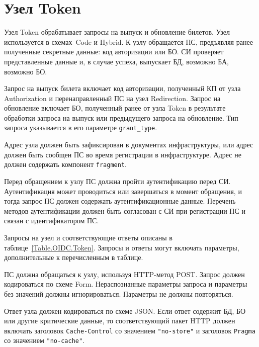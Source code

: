 \section{Узел Token}\label{OIDC.Token}

Узел Token обрабатывает запросы на выпуск и обновление билетов.
%
Узел используется в схемах~Code и Hybrid. 
% 
К узлу обращается ПС, предъявляя ранее полученные секретные данные:
код авторизации или БО.
%
СИ проверяет представленные данные и, в случае успеха, выпускает БД, 
возможно БА, возможно БО.

Запрос на выпуск билета включает код авторизации, полученный КП от узла 
Authorization и перенаправленный ПС на узел Redirection. 
%
Запрос на обновление включает БО, полученный ранее от узла Token в результате 
обработки запроса на выпуск или предыдущего запроса на обновление.
%
Тип запроса указывается в его параметре \lstinline{grant_type}.

Адрес узла должен быть зафиксирован в документах инфраструктуры,
или адрес должен быть сообщен ПС во время регистрации в инфраструктуре.
%
Адрес не должен содержать компонент \lstinline{fragment}.

Перед обращением к узлу ПС должна пройти аутентификацию перед СИ. 
Аутентификация может проводиться или завершаться в момент обращения,
и тогда запрос ПС должен содержать аутентификационные данные. 
%
Перечень методов аутентификации должен быть согласован с СИ при 
регистрации ПС и связан с идентификатором ПС.

Запросы на узел и соответствующие ответы описаны в 
таблице~\ref{Table.OIDC.Token}. 
%
Запросы и ответы могут включать параметры, дополнительные к перечисленным в 
таблице.

ПС должна обращаться к узлу, используя HTTP-метод POST.
%
Запрос должен кодироваться по схеме Form.
%
Нераспознанные параметры запроса и параметры без значений должны 
игнорироваться.
%
Параметры не должны повторяться.

Ответ узла должен кодироваться по схеме JSON. 
%
Если ответ содержит БД, БО или другие критические данные, то соответствующий 
пакет HTTP должен включать заголовок \lstinline{Cache-Control} со значением
\lstinline{"no-store"} и заголовок \lstinline{Pragma} со значением 
\lstinline{"no-cache"}.

